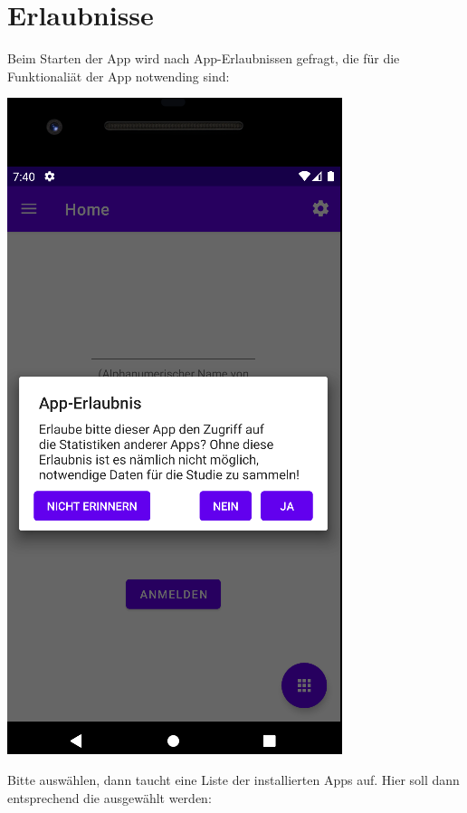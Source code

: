 \documentclass[ngerman]{tutorial}
\begin{document}
\section{Erlaubnisse}
Beim Starten der App wird nach App-Erlaubnissen gefragt, die für die Funktionaliät der App notwending sind:
\begin{center}
    \includegraphics[scale=0.4]{start_per.png}
\end{center}
Bitte  auswählen, dann taucht eine Liste der installierten Apps auf. Hier soll dann entsprechend die  ausgewählt werden:
\end{document}
